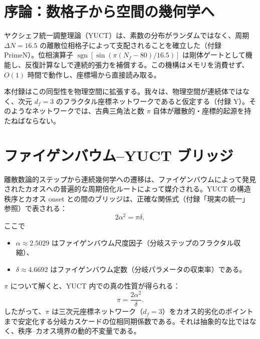 \documentclass[12pt,a4paper]{article}
\newcommand{\df}{d_{\!f}}
\begin{document}
	\tableofcontents
	\newpage
	
	\section{序論：数格子から空間の幾何学へ}
	
	ヤクシェフ統一調整理論（YUCT）は、素数の分布がランダムではなく、周期 $\Delta N = 16.5$ の離散位相格子によって支配されることを確立した（付録 PrimeN）。位相演算子 $\operatorname{sgn}[\sin(\pi(N_f-80)/16.5)]$ は剛体ゲートとして機能し、反復計算なしで連続的張力を補償する。この機構はメモリを消費せず、$O(1)$ 時間で動作し、座標場から直接読み取る。
	
	本付録はこの同型性を物理空間に拡張する。我々は、物理空間が連続体ではなく、次元 $\df=3$ のフラクタル座標ネットワークであると仮定する（付録 Y）。そのようなネットワークでは、古典三角法と数 $\pi$ 自体が離散的・座標的起源を持たねばならない。
	
	\section{ファイゲンバウム–YUCT ブリッジ}
	\label{sec:bridge}
	
	離散数論的ステップから連続幾何学への遷移は、ファイゲンバウムによって発見されたカオスへの普遍的な周期倍化ルートによって媒介される。YUCT の構造秩序とカオス onset との間のブリッジは、正確な関係式（付録「現実の統一」~\cite{UnityReality} 参照）で表される：
	\begin{equation}
		2\alpha^2 = \pi\delta,
		\label{eq:bridge}
	\end{equation}
	ここで
	\begin{itemize}
		\item $\alpha \approx 2.5029$ はファイゲンバウム尺度因子（分岐ステップのフラクタル収縮）、
		\item $\delta \approx 4.6692$ はファイゲンバウム定数（分岐パラメータの収束率）である。
	\end{itemize}
	$\pi$ について解くと、YUCT 内での真の性質が得られる：
	\begin{equation}
		\boxed{\pi = \frac{2\alpha^2}{\delta}}.
		\label{eq:pi-from-feigenbaum}
	\end{equation}
	したがって、$\pi$ は三次元座標ネットワーク（$\df=3$）をカオス的劣化のポイントまで安定化する分岐カスケードの位相同期係数である。それは抽象的な比ではなく、秩序–カオス境界の動的不変量である。
	
\end{document}
